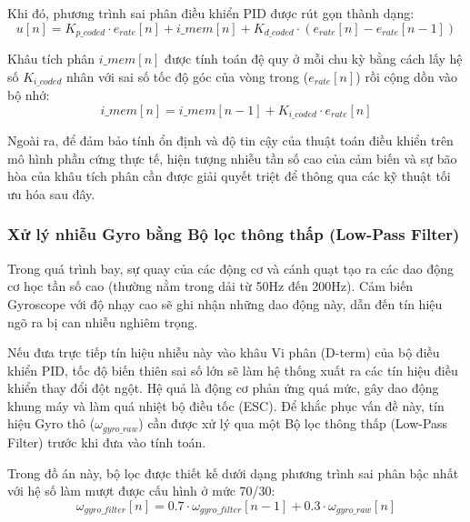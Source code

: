 Khi đó, phương trình sai phân điều khiển PID được rút gọn thành dạng:
\begin{equation}
    u[n] = K_{p\_coded} \cdot e_{rate}[n] + i\_mem[n] + K_{d\_coded} \cdot (e_{rate}[n] - e_{rate}[n-1])
\end{equation}

Khâu tích phân $i\_mem[n]$ được tính toán đệ quy ở mỗi chu kỳ bằng cách lấy hệ số $K_{i\_coded}$ nhân với sai số tốc độ góc của vòng trong ($e_{rate}[n]$) rồi cộng dồn vào bộ nhớ:
\begin{equation}
    i\_mem[n] = i\_mem[n-1] + K_{i\_coded} \cdot e_{rate}[n]
\end{equation}


Ngoài ra, để đảm bảo tính ổn định và độ tin cậy của thuật toán điều khiển trên mô hình phần cứng thực tế, hiện tượng nhiễu tần số cao của cảm biến và sự bão hòa của khâu tích phân cần được giải quyết triệt để thông qua các kỹ thuật tối ưu hóa sau đây.

\subsubsection{Xử lý nhiễu Gyro bằng Bộ lọc thông thấp (Low-Pass Filter)}

Trong quá trình bay, sự quay của các động cơ và cánh quạt tạo ra các dao động cơ học tần số cao (thường nằm trong dải từ 50Hz đến 200Hz). Cảm biến Gyroscope với độ nhạy cao sẽ ghi nhận những dao động này, dẫn đến tín hiệu ngõ ra bị can nhiễu nghiêm trọng.

Nếu đưa trực tiếp tín hiệu nhiễu này vào khâu Vi phân (D-term) của bộ điều khiển PID, tốc độ biến thiên sai số lớn sẽ làm hệ thống xuất ra các tín hiệu điều khiển thay đổi đột ngột. Hệ quả là động cơ phản ứng quá mức, gây dao động khung máy và làm quá nhiệt bộ điều tốc (ESC). Để khắc phục vấn đề này, tín hiệu Gyro thô ($\omega_{gyro\_raw}$) cần được xử lý qua một Bộ lọc thông thấp (Low-Pass Filter) trước khi đưa vào tính toán.

Trong đồ án này, bộ lọc được thiết kế dưới dạng phương trình sai phân bậc nhất với hệ số làm mượt được cấu hình ở mức 70/30:
\begin{equation}
    \omega_{gyro\_filter}[n] = 0.7 \cdot \omega_{gyro\_filter}[n-1] + 0.3 \cdot \omega_{gyro\_raw}[n]
\end{equation}

